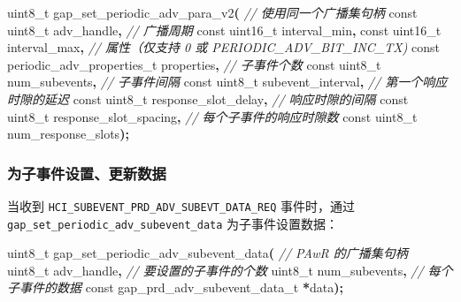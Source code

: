 \documentclass[
  12pt,
]{book}
\newenvironment{Shaded}{\begin{snugshade}}{\end{snugshade}}
\newcommand{\CommentTok}[1]{\textcolor[rgb]{0.56,0.35,0.01}{\textit{#1}}}
\newcommand{\DataTypeTok}[1]{\textcolor[rgb]{0.13,0.29,0.53}{#1}}
\newcommand{\NormalTok}[1]{#1}
\newcommand{\OperatorTok}[1]{\textcolor[rgb]{0.81,0.36,0.00}{\textbf{#1}}}
\begin{document}
\begin{Shaded}
\begin{Highlighting}[]
\DataTypeTok{uint8\_t}\NormalTok{ gap\_set\_periodic\_adv\_para\_v2}\OperatorTok{(}
  \CommentTok{// 使用同一个广播集句柄}
  \DataTypeTok{const} \DataTypeTok{uint8\_t}\NormalTok{ adv\_handle}\OperatorTok{,}
  \CommentTok{// 广播周期}
  \DataTypeTok{const} \DataTypeTok{uint16\_t}\NormalTok{ interval\_min}\OperatorTok{,}
  \DataTypeTok{const} \DataTypeTok{uint16\_t}\NormalTok{ interval\_max}\OperatorTok{,}
  \CommentTok{// 属性（仅支持 0 或 PERIODIC\_ADV\_BIT\_INC\_TX)}
  \DataTypeTok{const}\NormalTok{ periodic\_adv\_properties\_t properties}\OperatorTok{,}
  \CommentTok{// 子事件个数}
  \DataTypeTok{const} \DataTypeTok{uint8\_t}\NormalTok{ num\_subevents}\OperatorTok{,}
  \CommentTok{// 子事件间隔}
  \DataTypeTok{const} \DataTypeTok{uint8\_t}\NormalTok{ subevent\_interval}\OperatorTok{,}
  \CommentTok{// 第一个响应时隙的延迟}
  \DataTypeTok{const} \DataTypeTok{uint8\_t}\NormalTok{ response\_slot\_delay}\OperatorTok{,}
  \CommentTok{// 响应时隙的间隔}
  \DataTypeTok{const} \DataTypeTok{uint8\_t}\NormalTok{ response\_slot\_spacing}\OperatorTok{,}
  \CommentTok{// 每个子事件的响应时隙数}
  \DataTypeTok{const} \DataTypeTok{uint8\_t}\NormalTok{ num\_response\_slots}\OperatorTok{);}
\end{Highlighting}
\end{Shaded}

\hypertarget{ux4e3aux5b50ux4e8bux4ef6ux8bbeux7f6eux66f4ux65b0ux6570ux636e}{%
\subsubsection{为子事件设置、更新数据}\label{ux4e3aux5b50ux4e8bux4ef6ux8bbeux7f6eux66f4ux65b0ux6570ux636e}}

当收到 \texttt{HCI\_SUBEVENT\_PRD\_ADV\_SUBEVT\_DATA\_REQ} 事件时，通过
\texttt{gap\_set\_periodic\_adv\_subevent\_data} 为子事件设置数据：

\begin{Shaded}
\begin{Highlighting}[]
\DataTypeTok{uint8\_t}\NormalTok{ gap\_set\_periodic\_adv\_subevent\_data}\OperatorTok{(}
  \CommentTok{// PAwR 的广播集句柄}
  \DataTypeTok{uint8\_t}\NormalTok{ adv\_handle}\OperatorTok{,}
  \CommentTok{// 要设置的子事件的个数}
  \DataTypeTok{uint8\_t}\NormalTok{ num\_subevents}\OperatorTok{,}
  \CommentTok{// 每个子事件的数据}
  \DataTypeTok{const}\NormalTok{ gap\_prd\_adv\_subevent\_data\_t }\OperatorTok{*}\NormalTok{data}\OperatorTok{);}
\end{Highlighting}
\end{Shaded}
\end{document}
